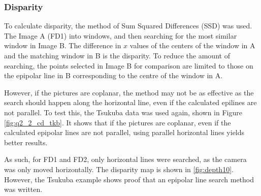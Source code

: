 \documentclass[a4paper, 10pt, conference]{ieeeconf}
\begin{document}
\subsubsection{Disparity}
To calculate disparity, the method of Sum Squared Differences (SSD) was used. The Image A (FD1) into windows, and then searching for the most similar window in Image B. The difference in $x$ values of the centers of the window in A and the matching window in B is the disparity. To reduce the amount of searching, the points selected in Image B for comparison are limited to those on the epipolar line in B corresponding to the centre of the window in A.

However, if the pictures are coplanar, the method may not be as effective as the search should happen along the horizontal line, even if the calculated epilines are not parallel. To test this, the Tsukuba data was used again, shown in Figure \ref{fig:q2_2_cd_tkb}. It shows that if the pictures are coplanar, even if the calculated epipolar lines are not parallel, using parallel horizontal lines yields better results.

As such, for FD1 and FD2, only horizontal lines were searched, as the camera was only moved horizontally. The disparity map is shown in \ref{fig:depth10}.  However, the Tsukuba example shows proof that an epipolar line search method was written.
\end{document}
